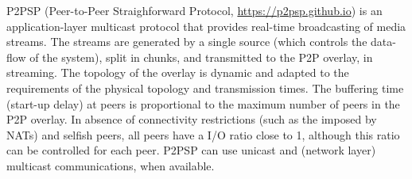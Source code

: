 

P2PSP (Peer-to-Peer Straighforward Protocol,
\url{https://p2psp.github.io}) is an application-layer multicast
protocol that provides real-time broadcasting of media streams. The
streams are generated by a single source (which controls the data-flow
of the system), split in chunks, and transmitted to the P2P overlay,
in streaming. The topology of the overlay is dynamic and adapted to
the requirements of the physical topology and transmission times. The
buffering time (start-up delay) at peers is proportional to the
maximum number of peers in the P2P overlay. In absence of connectivity
restrictions (such as the imposed by NATs) and selfish peers, all
peers have a I/O ratio close to 1, although this ratio can be
controlled for each peer. P2PSP can use unicast and (network layer)
multicast communications, when available.